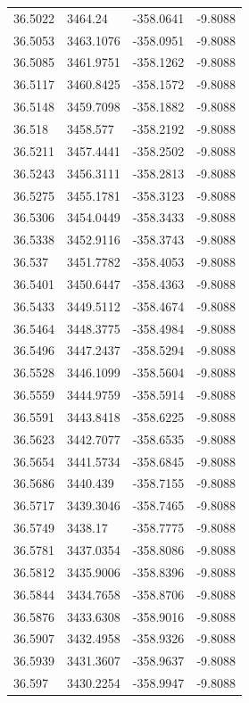 \begin{table}[H]
\begin{tabular}{llll}
36.5022 & 3464.24 & -358.0641 & -9.8088 \\
36.5053 & 3463.1076 & -358.0951 & -9.8088 \\
36.5085 & 3461.9751 & -358.1262 & -9.8088 \\
36.5117 & 3460.8425 & -358.1572 & -9.8088 \\
36.5148 & 3459.7098 & -358.1882 & -9.8088 \\
36.518 & 3458.577 & -358.2192 & -9.8088 \\
36.5211 & 3457.4441 & -358.2502 & -9.8088 \\
36.5243 & 3456.3111 & -358.2813 & -9.8088 \\
36.5275 & 3455.1781 & -358.3123 & -9.8088 \\
36.5306 & 3454.0449 & -358.3433 & -9.8088 \\
36.5338 & 3452.9116 & -358.3743 & -9.8088 \\
36.537 & 3451.7782 & -358.4053 & -9.8088 \\
36.5401 & 3450.6447 & -358.4363 & -9.8088 \\
36.5433 & 3449.5112 & -358.4674 & -9.8088 \\
36.5464 & 3448.3775 & -358.4984 & -9.8088 \\
36.5496 & 3447.2437 & -358.5294 & -9.8088 \\
36.5528 & 3446.1099 & -358.5604 & -9.8088 \\
36.5559 & 3444.9759 & -358.5914 & -9.8088 \\
36.5591 & 3443.8418 & -358.6225 & -9.8088 \\
36.5623 & 3442.7077 & -358.6535 & -9.8088 \\
36.5654 & 3441.5734 & -358.6845 & -9.8088 \\
36.5686 & 3440.439 & -358.7155 & -9.8088 \\
36.5717 & 3439.3046 & -358.7465 & -9.8088 \\
36.5749 & 3438.17 & -358.7775 & -9.8088 \\
36.5781 & 3437.0354 & -358.8086 & -9.8088 \\
36.5812 & 3435.9006 & -358.8396 & -9.8088 \\
36.5844 & 3434.7658 & -358.8706 & -9.8088 \\
36.5876 & 3433.6308 & -358.9016 & -9.8088 \\
36.5907 & 3432.4958 & -358.9326 & -9.8088 \\
36.5939 & 3431.3607 & -358.9637 & -9.8088 \\
36.597 & 3430.2254 & -358.9947 & -9.8088 \\

\end{tabular}
\end{table}
